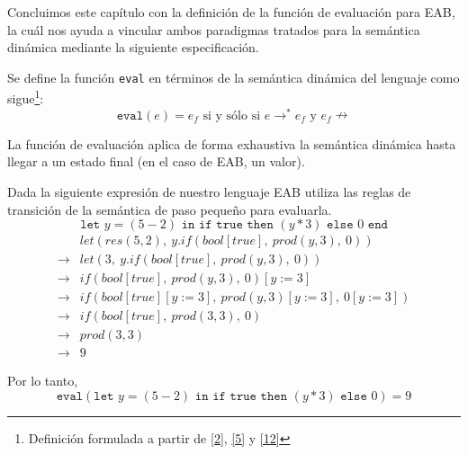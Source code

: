     Concluimos este capítulo con la definición de la función de evaluación para \textsf{EAB}, la cuál nos ayuda a vincular ambos paradigmas tratados para la semántica dinámica mediante la siguiente especificación.
    \begin{definition} Se define la función \texttt{eval} en términos de la semántica dinámica del lenguaje como sigue\footnote{Definición formulada a partir de \hyperlink{2}{[2]}, \hyperlink{5}{[5]} y  \hyperlink{12}{[12]} }:
    $$\texttt{eval}(e)=e_f\mbox{ si y sólo si } e \rightarrow^* e_f \mbox{ y }e_f \nrightarrow $$

    La función de evaluación aplica de forma exhaustiva la semántica dinámica hasta llegar a un estado final (en el caso de \textsf{EAB}, un valor).
    \end{definition}
    
    \begin{exercise}
    	Dada la siguiente expresión de nuestro lenguaje \textsf{EAB} utiliza las reglas de transición de la semántica de paso pequeño para evaluarla.
    	\[
    	\texttt{let } y = (5 - 2) \texttt{ in } \texttt{if true then } (y * 3) \texttt{ else } 0 \texttt{ end}
    	\]
    	\[
    	\begin{array}{cl}
    		&\textit{let}(\textit{res}(5,2),\ y.\textit{if}(bool[true],\ \textit{prod}(y,3),\ 0))\\
    		\rightarrow &\textit{let}(3,\ y.\textit{if}(bool[true],\ \textit{prod}(y,3),\ 0))\\
    		\rightarrow &\textit{if}(bool[true],\ \textit{prod}(y,3),\ 0)[y:=3]\\
    		\rightarrow &\textit{if}(bool[true][y:=3],\ \textit{prod}(y,3)[y:=3],\ 0[y:=3])\\
    		\rightarrow &\textit{if}(bool[true],\ \textit{prod}(3,3),\ 0)\\
    		\rightarrow &\textit{prod}(3,3)\\
    		\rightarrow &9
    	\end{array}
    	\]
    	
    	Por lo tanto,
    	\[
    	\texttt{eval}(\texttt{let } y = (5 - 2) \texttt{ in if true then } (y * 3) \texttt{ else } 0) = 9
    	\]
    \end{exercise}
    
    
    
